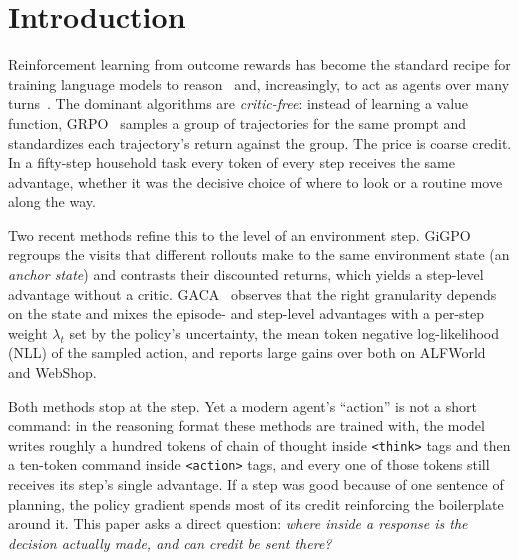 \section{Introduction}
\label{sec:intro}

Reinforcement learning from outcome rewards has become the standard recipe for training language
models to reason~\cite{shao2024deepseekmath,guo2025deepseekr1} and, increasingly, to act as agents over
many turns~\cite{feng2025gigpo,wang2025ragen,liang2026gaca}. The dominant algorithms are
\emph{critic-free}: instead of learning a value function, GRPO~\cite{shao2024deepseekmath} samples a
group of trajectories for the same prompt and standardizes each trajectory's return against the group.
The price is coarse credit. In a fifty-step household task every token of every step receives the
same advantage, whether it was the decisive choice of where to look or a routine move along the way.

Two recent methods refine this to the level of an environment step. GiGPO~\cite{feng2025gigpo}
regroups the visits that different rollouts make to the same environment state (an \emph{anchor
state}) and contrasts their discounted returns, which yields a step-level advantage without a critic.
GACA~\cite{liang2026gaca} observes that the right granularity depends on the state and mixes the
episode- and step-level advantages with a per-step weight $\lambda_t$ set by the policy's uncertainty,
the mean token negative log-likelihood (NLL) of the sampled action, and reports large gains over
both on ALFWorld and WebShop.

Both methods stop at the step. Yet a modern agent's ``action'' is not a short command: in the
reasoning format these methods are trained with, the model writes roughly a hundred tokens of
chain of thought inside \texttt{<think>} tags and then a ten-token command inside \texttt{<action>}
tags, and every one of those tokens still receives its step's single advantage. If a step was good
because of one sentence of planning, the policy gradient spends most of its credit reinforcing the
boilerplate around it. This paper asks a direct question: \emph{where inside a response is the
decision actually made, and can credit be sent there?}

